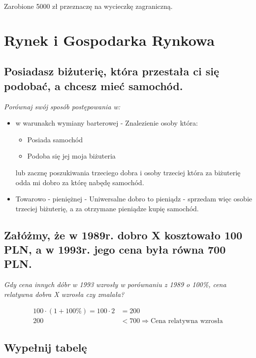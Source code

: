 \documentclass[a4paper,12pt]{article}
\begin{document}
\vspace{1cm}

Zarobione 5000 zł przeznaczę na wycieczkę zagraniczną.

\section{Rynek i Gospodarka Rynkowa}

\subsection{Posiadasz biżuterię, która przestała ci się podobać, a chcesz mieć samochód.}

\emph{Porównaj swój sposób postępowania w:}

\begin{itemize}
	\item w warunakch wymiany barterowej - Znalezienie osoby która:
	\begin{itemize}
		\item Posiada samochód
		\item Podoba się jej moja biżuteria
	\end{itemize}
	lub zacznę poszukiwania trzeciego dobra i osoby trzeciej która za biżuterię odda mi dobro za którę nabędę samochód.
	\item Towarowo - pieniężnej - Uniwersalne dobro to pieniądz - sprzedam więc osobie trzeciej biżuterię, a za otrzymane pieniądze kupię samochód.
\end{itemize}

\subsection{Załóżmy, że w 1989r. dobro X kosztowało 100 PLN, a w 1993r. jego cena była równa 700 PLN.}

\emph{Gdy cena innych dóbr w 1993 wzrosły w porównaniu z 1989 o 100\%, cena relatywna dobra X wzrosła czy zmalała?}

\begin{align*}
	100 \cdot \left(1 + 100 \%\right) = 100 \cdot 2 &= 200 \\
	200 &< 700 \Rightarrow \text{Cena relatywna wzrosła}
\end{align*}

\subsection{Wypełnij tabelę}
\end{document}
